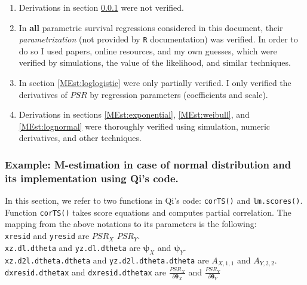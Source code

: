 \documentclass[]{article}
\begin{document}
\begin{enumerate}[1)]
\item Derivations in section \ref{norm:QiCode} were not verified.

\item In \textbf{all} parametric survival regressions considered in this document, their \emph{parametrization} (not provided by \texttt{R} documentation) was verified. In order to do so I used papers, online resources, and my own guesses, which were verified by simulations, the value of the likelihood, and similar techniques.

\item In section \ref{MEst:loglogistic} were only partially verified. I only verified the derivatives of $PSR$ by regression parameters (coefficients and scale).

\item Derivations in sections \ref{MEst:exponential}, \ref{MEst:weibull}, and \ref{MEst:lognormal}  were thoroughly verified using simulation, numeric derivatives, and other techniques.


\end{enumerate}

\subsubsection{Example: M-estimation in case of normal distribution and its implementation using Qi's code.}
\label{norm:QiCode}

In this section, we refer to two functions in Qi's code: \texttt{corTS()} and \texttt{lm.scores()}. Function  \texttt{corTS()} takes score equations and computes partial correlation. The mapping from the above notations to its parameters is the following:\\
\texttt{xresid} and \texttt{yresid} are $PSR_X$ $PSR_Y$.\\
\texttt{xz.dl.dtheta} and \texttt{yz.dl.dtheta} are $\pmb{\psi}_{X}$ and $\pmb{\psi}_{Y}$.\\
\texttt{xz.d2l.dtheta.dtheta} and \texttt{yz.d2l.dtheta.dtheta} are $A_{X,1,1}$ and $A_{Y,2,2}$.\\
\texttt{dxresid.dthetax} and \texttt{dxresid.dthetax} are $\frac{PSR_X}{\partial \pmb{\theta}_X}$ and $\frac{PSR_Y}{\partial \pmb{\theta}_Y}$\\
\end{document}

